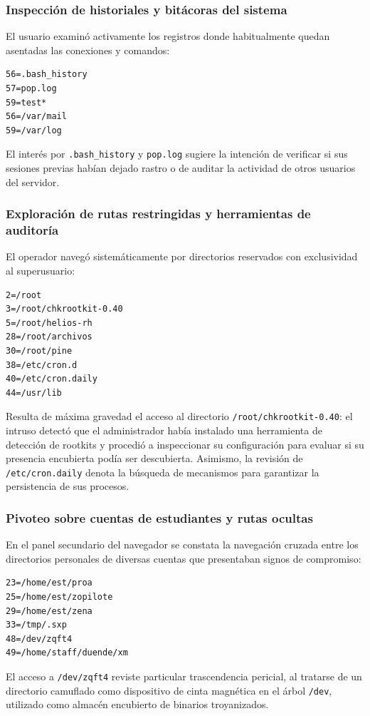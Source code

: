 \subsubsection{Inspección de historiales y bitácoras del sistema}

El usuario examinó activamente los registros donde habitualmente quedan asentadas las conexiones y comandos:
\begin{lstlisting}[style=terminal]
56=.bash_history
57=pop.log
59=test*
56=/var/mail
59=/var/log
\end{lstlisting}
El interés por \texttt{.bash\_history} y \texttt{pop.log} sugiere la intención de verificar si sus sesiones previas habían dejado rastro o de auditar la actividad de otros usuarios del servidor.

\subsubsection{Exploración de rutas restringidas y herramientas de auditoría}

El operador navegó sistemáticamente por directorios reservados con exclusividad al superusuario:
\begin{lstlisting}[style=terminal]
2=/root
3=/root/chkrootkit-0.40
5=/root/helios-rh
28=/root/archivos
30=/root/pine
38=/etc/cron.d
40=/etc/cron.daily
44=/usr/lib
\end{lstlisting}
Resulta de máxima gravedad el acceso al directorio \texttt{/root/chkrootkit-0.40}: el intruso detectó que el administrador había instalado una herramienta de detección de rootkits y procedió a inspeccionar su configuración para evaluar si su presencia encubierta podía ser descubierta. Asimismo, la revisión de \texttt{/etc/cron.daily} denota la búsqueda de mecanismos para garantizar la persistencia de sus procesos.

\subsubsection{Pivoteo sobre cuentas de estudiantes y rutas ocultas}

En el panel secundario del navegador se constata la navegación cruzada entre los directorios personales de diversas cuentas que presentaban signos de compromiso:
\begin{lstlisting}[style=terminal]
23=/home/est/proa
25=/home/est/zopilote
29=/home/est/zena
33=/tmp/.sxp
48=/dev/zqft4
49=/home/staff/duende/xm
\end{lstlisting}
El acceso a \texttt{/dev/zqft4} reviste particular trascendencia pericial, al tratarse de un directorio camuflado como dispositivo de cinta magnética en el árbol \texttt{/dev}, utilizado como almacén encubierto de binarios troyanizados.

